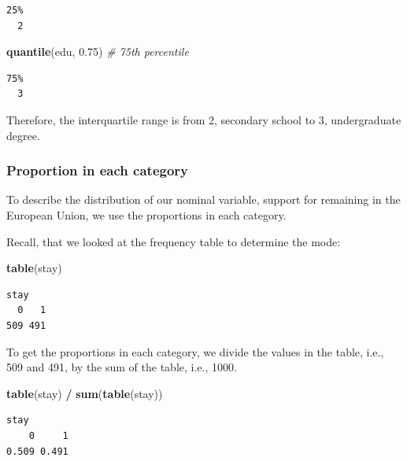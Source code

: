 \documentclass[]{book}
\newenvironment{Shaded}{\begin{snugshade}}{\end{snugshade}}
\newcommand{\KeywordTok}[1]{\textcolor[rgb]{0.13,0.29,0.53}{\textbf{#1}}}
\newcommand{\FloatTok}[1]{\textcolor[rgb]{0.00,0.00,0.81}{#1}}
\newcommand{\StringTok}[1]{\textcolor[rgb]{0.31,0.60,0.02}{#1}}
\newcommand{\CommentTok}[1]{\textcolor[rgb]{0.56,0.35,0.01}{\textit{#1}}}
\newcommand{\OperatorTok}[1]{\textcolor[rgb]{0.81,0.36,0.00}{\textbf{#1}}}
\newcommand{\NormalTok}[1]{#1}
\theoremstyle{definition}
\theoremstyle{definition}
\theoremstyle{definition}
\theoremstyle{remark}
\begin{document}
\begin{verbatim}
25% 
  2 
\end{verbatim}

\begin{Shaded}
\begin{Highlighting}[]
\KeywordTok{quantile}\NormalTok{(edu, }\FloatTok{0.75}\NormalTok{) }\CommentTok{# 75th percentile}
\end{Highlighting}
\end{Shaded}

\begin{verbatim}
75% 
  3 
\end{verbatim}

Therefore, the interquartile range is from 2, secondary school to 3,
undergraduate degree.

\subsubsection{Proportion in each
category}\label{proportion-in-each-category}

To describe the distribution of our nominal variable, support for
remaining in the European Union, we use the proportions in each
category.

Recall, that we looked at the frequency table to determine the mode:

\begin{Shaded}
\begin{Highlighting}[]
\KeywordTok{table}\NormalTok{(stay)}
\end{Highlighting}
\end{Shaded}

\begin{verbatim}
stay
  0   1 
509 491 
\end{verbatim}

To get the proportions in each category, we divide the values in the
table, i.e., 509 and 491, by the sum of the table, i.e., 1000.

\begin{Shaded}
\begin{Highlighting}[]
\KeywordTok{table}\NormalTok{(stay) }\OperatorTok{/}\StringTok{ }\KeywordTok{sum}\NormalTok{(}\KeywordTok{table}\NormalTok{(stay))}
\end{Highlighting}
\end{Shaded}

\begin{verbatim}
stay
    0     1 
0.509 0.491 
\end{verbatim}
\end{document}
